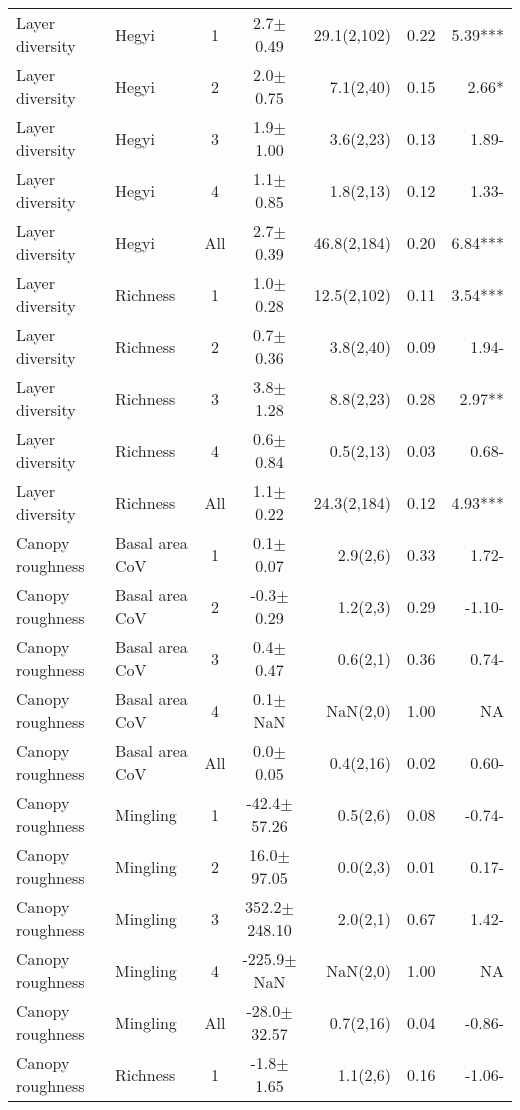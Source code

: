 \begin{longtable}{llcS[table-format=5.1(4.2)]rS[table-format=1.2]r}
   \midrule
Layer diversity & Hegyi & 1 & 2.7$\pm$0.49 & 29.1(2,102) & 0.22 & 5.39*** \\ 
  Layer diversity & Hegyi & 2 & 2.0$\pm$0.75 & 7.1(2,40) & 0.15 & 2.66* \\ 
  Layer diversity & Hegyi & 3 & 1.9$\pm$1.00 & 3.6(2,23) & 0.13 & 1.89- \\ 
  Layer diversity & Hegyi & 4 & 1.1$\pm$0.85 & 1.8(2,13) & 0.12 & 1.33- \\ 
  Layer diversity & Hegyi & All & 2.7$\pm$0.39 & 46.8(2,184) & 0.20 & 6.84*** \\ 
   \midrule
Layer diversity & Richness & 1 & 1.0$\pm$0.28 & 12.5(2,102) & 0.11 & 3.54*** \\ 
  Layer diversity & Richness & 2 & 0.7$\pm$0.36 & 3.8(2,40) & 0.09 & 1.94- \\ 
  Layer diversity & Richness & 3 & 3.8$\pm$1.28 & 8.8(2,23) & 0.28 & 2.97** \\ 
  Layer diversity & Richness & 4 & 0.6$\pm$0.84 & 0.5(2,13) & 0.03 & 0.68- \\ 
  Layer diversity & Richness & All & 1.1$\pm$0.22 & 24.3(2,184) & 0.12 & 4.93*** \\ 
   \midrule
Canopy roughness & Basal area CoV & 1 & 0.1$\pm$0.07 & 2.9(2,6) & 0.33 & 1.72- \\ 
  Canopy roughness & Basal area CoV & 2 & -0.3$\pm$0.29 & 1.2(2,3) & 0.29 & -1.10- \\ 
  Canopy roughness & Basal area CoV & 3 & 0.4$\pm$0.47 & 0.6(2,1) & 0.36 & 0.74- \\ 
  Canopy roughness & Basal area CoV & 4 & 0.1$\pm$NaN & NaN(2,0) & 1.00 & NA \\ 
  Canopy roughness & Basal area CoV & All & 0.0$\pm$0.05 & 0.4(2,16) & 0.02 & 0.60- \\ 
   \midrule
Canopy roughness & Mingling & 1 & -42.4$\pm$57.26 & 0.5(2,6) & 0.08 & -0.74- \\ 
  Canopy roughness & Mingling & 2 & 16.0$\pm$97.05 & 0.0(2,3) & 0.01 & 0.17- \\ 
  Canopy roughness & Mingling & 3 & 352.2$\pm$248.10 & 2.0(2,1) & 0.67 & 1.42- \\ 
  Canopy roughness & Mingling & 4 & -225.9$\pm$NaN & NaN(2,0) & 1.00 & NA \\ 
  Canopy roughness & Mingling & All & -28.0$\pm$32.57 & 0.7(2,16) & 0.04 & -0.86- \\ 
   \midrule
Canopy roughness & Richness & 1 & -1.8$\pm$1.65 & 1.1(2,6) & 0.16 & -1.06- \\ 

\end{longtable}
